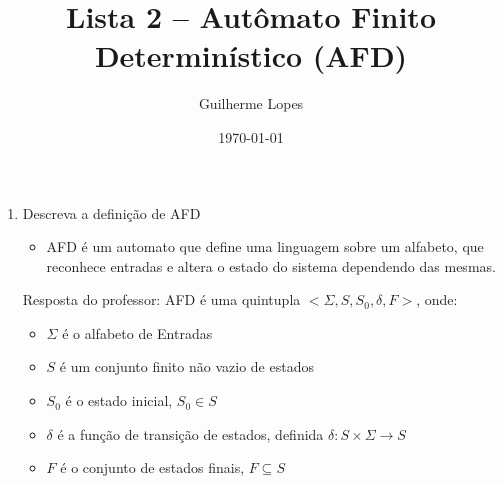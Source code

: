 \documentclass[12pt]{article}
\title{Lista 2 -- Autômato Finito Determinístico (AFD)}
\author{Guilherme Lopes}
\date{\today}
\begin{document}
\maketitle


\begin{enumerate}
    \item Descreva a definição de AFD
    \begin{itemize}[label=R:]
        \item AFD é um automato que define uma linguagem sobre um alfabeto, que 
        reconhece entradas e altera o estado do sistema dependendo das mesmas.
    \end{itemize}
    Resposta do professor: AFD é uma quintupla $<\Sigma, S, S_0, \delta, F>$, 
    onde:
    \begin{itemize}
        \item $\Sigma$ é o alfabeto de Entradas
        \item $S$ é um conjunto finito não vazio de estados
        \item $S_0$ é o estado inicial, $S_0 \in S$
        \item $\delta$ é a função de transição de estados, definida 
        $\delta:S \times \Sigma \rightarrow S $
        \item $F$ é o conjunto de estados finais, $F \subseteq S$
    \end{itemize}


\end{enumerate}
\end{document}
